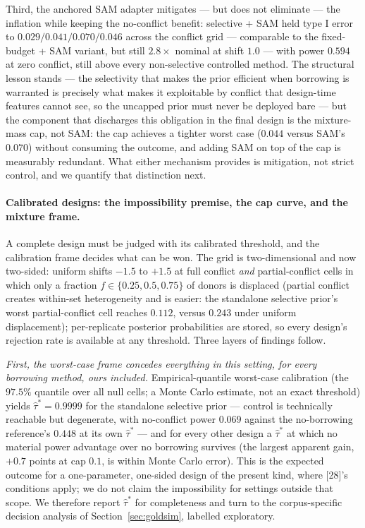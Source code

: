 \documentclass[11pt]{article}
\begin{document}
Third, the anchored SAM adapter mitigates --- but does not eliminate --- the
inflation while keeping the
no-conflict benefit: selective + SAM held type I error to $0.029/0.041/0.070/
0.046$ across the conflict grid --- comparable to the fixed-budget + SAM
variant, but still $2.8\times$ nominal at shift $1.0$ --- with power $0.594$
at zero conflict, still above every
non-selective controlled method. The structural lesson stands ---
the selectivity that makes the prior efficient when
borrowing is warranted is precisely what makes it exploitable by conflict
that design-time features cannot see, so the uncapped prior must never be
deployed bare --- but the component that discharges this obligation in the
final design is the mixture-mass cap, not SAM: the cap achieves a
tighter worst case ($0.044$ versus SAM's $0.070$) without consuming the
outcome, and adding SAM on top of the cap is measurably redundant. What
either mechanism provides is mitigation, not strict control, and we
quantify that distinction next.

\paragraph{Calibrated designs: the impossibility premise, the cap curve,
and the mixture frame.} A complete design must be judged with its
calibrated threshold, and the calibration frame decides what can be won.
The grid is two-dimensional and now two-sided: uniform shifts $-1.5$ to
$+1.5$ at full conflict \emph{and} partial-conflict cells in which only a
fraction $f \in \{0.25, 0.5, 0.75\}$ of donors is displaced (partial
conflict creates within-set heterogeneity and is easier: the standalone
selective prior's worst partial-conflict cell reaches $0.112$, versus
$0.243$ under uniform displacement); per-replicate posterior probabilities
are stored, so every design's rejection rate is available at any threshold.
Three layers of findings follow.

\emph{First, the worst-case frame concedes everything in this setting, for
every borrowing method, ours included.} Empirical-quantile worst-case
calibration (the $97.5\%$ quantile over all null cells; a Monte Carlo
estimate, not an exact threshold) yields $\hat\tau^{*} = 0.9999$ for the
standalone selective prior --- control is technically reachable but
degenerate, with no-conflict power $0.069$ against the no-borrowing
reference's $0.448$ at its own $\hat\tau^{*}$ --- and for every other design
a $\hat\tau^{*}$ at which no material power advantage over no borrowing
survives (the largest apparent gain, $+0.7$ points at cap $0.1$, is within
Monte Carlo error). This is the expected outcome for a one-parameter,
one-sided design of the present kind, where [28]'s conditions apply; we do
not claim the impossibility for settings outside that scope. We therefore
report $\hat\tau^{*}$ for completeness and turn to the corpus-specific
decision analysis of Section~\ref{sec:goldsim}, labelled exploratory.
\end{document}
